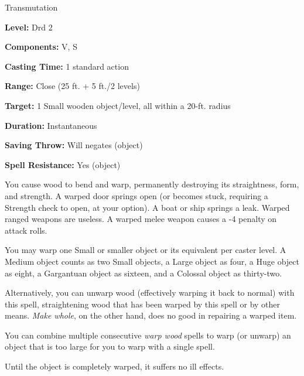 
Transmutation

\textbf{Level:} Drd 2

\textbf{Components:} V, S

\textbf{Casting Time:} 1 standard action

\textbf{Range:} Close (25 ft. + 5 ft./2 levels)

\textbf{Target:} 1 Small wooden object/level, all within a 20-ft. radius

\textbf{Duration:} Instantaneous

\textbf{Saving Throw:} Will negates (object)

\textbf{Spell Resistance:} Yes (object)

You cause wood to bend and warp, permanently destroying its straightness, form, 
and strength. A warped door springs open (or becomes stuck, requiring a Strength 
check to open, at your option). A boat or ship springs a leak. Warped ranged weapons 
are useless. A warped melee weapon causes a -4 penalty on attack rolls.

You may warp one Small or smaller object or its equivalent per caster level. A 
Medium object counts as two Small objects, a Large object as four, a Huge object 
as eight, a Gargantuan object as sixteen, and a Colossal object as thirty-two.

Alternatively, you can unwarp wood (effectively warping it back to normal) with 
this spell, straightening wood that has been warped by this spell or by other means. 
\textit{Make whole}, on the other hand, does no good in repairing a warped item.

You can combine multiple consecutive \textit{warp wood} spells to warp (or unwarp) 
an object that is too large for you to warp with a single spell. 

Until the object is completely warped, it suffers no ill effects.

